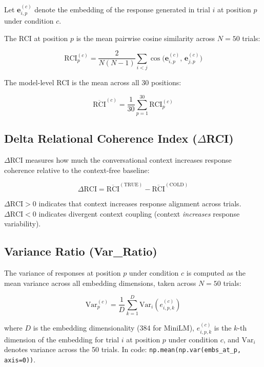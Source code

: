 \documentclass[11pt,a4paper]{article}
\begin{document}
Let $\mathbf{e}_{i,p}^{(c)}$ denote the embedding of the response generated in trial
$i$ at position $p$ under condition $c$.

The RCI at position $p$ is the mean pairwise cosine similarity across $N = 50$ trials:

\begin{equation}
    \text{RCI}_{p}^{(c)} = \frac{2}{N(N-1)} \sum_{i < j}
    \cos\!\big(\mathbf{e}_{i,p}^{(c)},\, \mathbf{e}_{j,p}^{(c)}\big)
\end{equation}

The model-level RCI is the mean across all 30 positions:

\begin{equation}
    \overline{\text{RCI}}^{(c)} = \frac{1}{30} \sum_{p=1}^{30} \text{RCI}_{p}^{(c)}
\end{equation}

\subsection{Delta Relational Coherence Index ($\Delta$RCI)}

$\Delta$RCI measures how much the conversational context increases response coherence
relative to the context-free baseline:

\begin{equation}
    \Delta\text{RCI} = \overline{\text{RCI}}^{(\text{TRUE})} -
    \overline{\text{RCI}}^{(\text{COLD})}
\end{equation}

$\Delta\text{RCI} > 0$ indicates that context increases response alignment across
trials. $\Delta\text{RCI} < 0$ indicates divergent context coupling (context
\emph{increases} response variability).

\subsection{Variance Ratio (Var\_Ratio)}

The variance of responses at position $p$ under condition $c$ is computed as the
mean variance across all embedding dimensions, taken across $N = 50$ trials:

\begin{equation}
    \text{Var}_{p}^{(c)} = \frac{1}{D} \sum_{k=1}^{D}
    \text{Var}_{i}\!\left( e_{i,p,k}^{(c)} \right)
\end{equation}

where $D$ is the embedding dimensionality (384 for MiniLM), $e_{i,p,k}^{(c)}$ is
the $k$-th dimension of the embedding for trial $i$ at position $p$ under condition
$c$, and $\text{Var}_{i}$ denotes variance across the 50 trials. In code:
\texttt{np.mean(np.var(embs\_at\_p, axis=0))}.
\end{document}

